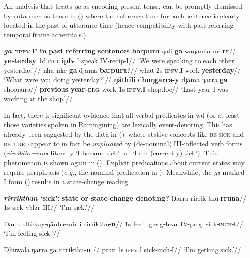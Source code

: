An analysis that treats \textit{ga} as encoding present tense, can be promptly dismissed by data such as those in (\nextx) where the reference time for each sentence is clearly located in the past of utterance time (hence compatibility with past-referring temporal frame adverbials.)

\pex \textbf{\textit{ga} `\textsc{ipfv}.\gls{I}' in past-referring sentences}
\a\begingl\gla \textbf{barpuru} ŋali \textbf{ga} waŋanha-mi-\textbf{rr}//
\glb \textbf{yesterday} 1d.\textsc{incl} \textbf{\gls{ipfv}}.\gls{I} speak.\gls{IV}-\gls{recip}-\gls{I}//
\glft`We were speaking to each other yesterday.'\trailingcitation{[AW~20190426]}//\endgl
\a\begingl\gla nhä nhe \textbf{ga} djäma \textbf{barpuru}?//
\glb what 2s \textsc{\textbf{ipfv}}.\gls{I} work \textbf{yesterday}//
\glft`What were you doing yesterday?'\trailingcitation{[DhG 20190413]}//\endgl
\a\begingl\gla \textbf{ŋäthili} \textbf{dhuŋgarra-y} djäma ŋarra \textbf{ga} shopŋura//
\glb \textbf{previous} \textbf{year-\textsc{erg}} work 1s \textsc{\textbf{ipfv.\gls{I}}} shop.\gls{loc}//
\glft`Last year I was working at the shop.'\trailingcitation{[DB~20190416]}//\endgl
\xe

In fact, there is significant evidence that all verbal predicates in \gls{wd} (or at least those varieties spoken in Ramingining) are lexically event-denoting. This has already been suggested by the data in (), where stative concepts like \textsc{be sick} and \textsc{be tired} appear to in fact be \textit{implicated} by (de-nominal) \gls{III}-inflected verb forms (\textit{rirrikthurruna} literally `I became sick'$ \rightsquigarrow $ `I am (currently) sick'). This phenomenon is shown again in (). Explicit predications about current states may require periphrasis (\textit{e.g.}, the nominal predication in ). Meanwhile, the \textit{ga}-marked \gls{I} form () results in a state-change reading.

\pex\textbf{\textit{rirrikthun} `sick': state or state-change denoting?}
\a{}\begingl\gla Ŋarra rirrik-thu-\textbf{rruna}//
\glb 1s sick-\gls{vblzr}-\gls{III}//
\glft`I'm sick.'\trailingcitation[DB~20190405]//\endgl

\a\begingl\gla Ŋarra dhäkay-ŋänha-mirri rirrikthu-\textbf{n}//
\glb 1s feeling.\gls{erg}-hear.\gls{IV}-\gls{prop} sick-\textsc{inch}-\gls{I}//
\glft`I'm feeling sick.'\trailingcitation[DB~20190405]//\endgl


\a\begingl\gla Dhuwala ŋarra ga rirrikthu-\textbf{n}
 //
\glb  \gls{prox} 1s \textsc{ipfv.\gls{I}} sick-\gls{inch}-\gls{I}//
\glft`I'm getting sick.'\trailingcitation[DB~20190405]//\endgl

